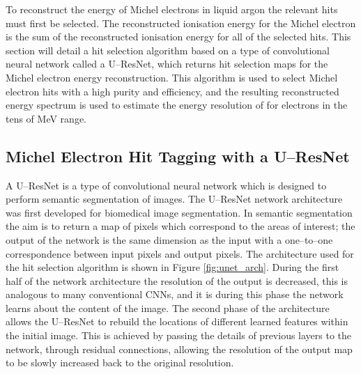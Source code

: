 To reconstruct the energy of Michel electrons in liquid argon the relevant hits
must first be selected. The reconstructed ionisation energy for the Michel
electron is the sum of the reconstructed ionisation energy for all of the
selected hits. This section will detail a hit selection algorithm based on a 
type of convolutional neural network called a U--ResNet, which returns hit 
selection maps for the Michel electron energy reconstruction. This algorithm 
is used to select Michel electron hits with a high purity and efficiency, and 
the resulting reconstructed energy spectrum is used to estimate the energy 
resolution of \protodune{} for electrons in the tens of MeV range.

\subsection{Michel Electron Hit Tagging with a U--ResNet}

A U--ResNet is a type of convolutional neural network which is designed to 
perform semantic segmentation of images. The U--ResNet network architecture 
was first developed for biomedical image segmentation\cite{ronneberger2015u}. 
In semantic segmentation the aim is to return a map of pixels which correspond 
to the areas of interest; the output of the network is the same dimension as 
the input with a one--to--one correspondence between input pixels and output 
pixels. The architecture used for the hit selection algorithm is shown in 
Figure \ref{fig:unet_arch}. During the first half of the network architecture 
the resolution of the output is decreased, this is analogous to many 
conventional CNNs, and it is during this phase the network learns about the 
content of the image. The second phase of the architecture allows the 
U--ResNet to rebuild the locations of different learned features within the 
initial image. This is achieved by passing the details of previous layers to 
the network, through residual connections, allowing the resolution of the 
output map to be slowly increased back to the original resolution.

